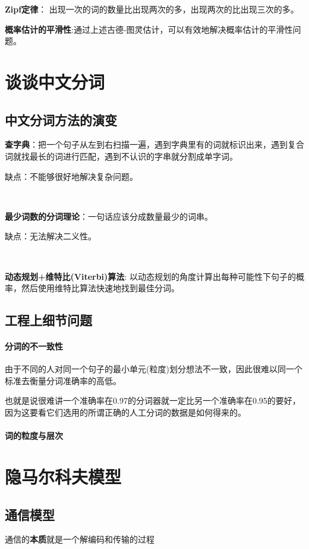 \documentclass[UTF8]{article}
\begin{document}
	\textbf{Zipf定律}： 出现一次的词的数量比出现两次的多，出现两次的比出现三次的多。

	\textbf{概率估计的平滑性}:通过上述古德-图灵估计，可以有效地解决概率估计的平滑性问题。

	\section{谈谈中文分词}
	\subsection{中文分词方法的演变}
	\textbf{查字典}：把一个句子从左到右扫描一遍，遇到字典里有的词就标识出来，遇到复合词就找最长的词进行匹配，遇到不认识的字串就分割成单字词。

	缺点：不能够很好地解决复杂问题。

	~

	\textbf{最少词数的分词理论}：一句话应该分成数量最少的词串。

	缺点：无法解决二义性。
	
	~

	\textbf{动态规划+维特比(Viterbi)算法}: 以动态规划的角度计算出每种可能性下句子的概率，然后使用维特比算法快速地找到最佳分词。

	\subsection{工程上细节问题}

	\paragraph{分词的不一致性}
	由于不同的人对同一个句子的最小单元(粒度)划分想法不一致，因此很难以同一个标准去衡量分词准确率的高低。

	也就是说很难讲一个准确率在0.97的分词器就一定比另一个准确率在0.95的要好，因为这要看它们选用的所谓正确的人工分词的数据是如何得来的。

	\paragraph{词的粒度与层次}
	
	\section{隐马尔科夫模型}
	\subsection{通信模型}
	通信的\textbf{本质}就是一个解编码和传输的过程
\end{document}
